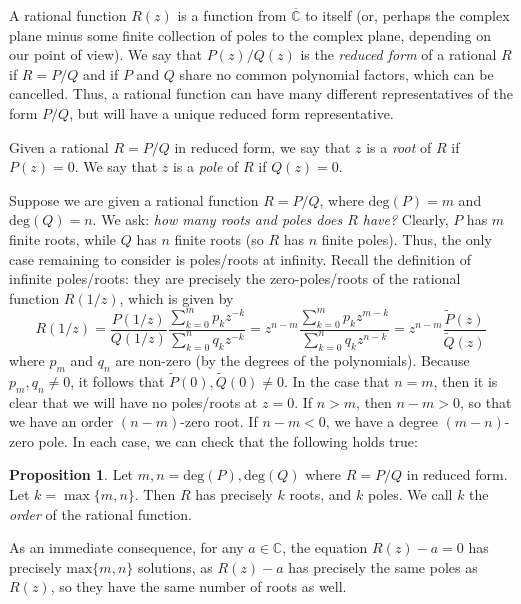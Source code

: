 \documentclass[aps,pra,showpacs,notitlepage,onecolumn,superscriptaddress,nofootinbib]{revtex4-1}
\theoremstyle{definition}
\newtheorem{proposition}{Proposition}[section]
\begin{document}
\noindent A rational function $R(z)$ is a function from $\overline{\mathbb{C}}$ to itself (or, perhaps the complex plane minus some finite collection of poles to the complex plane,
depending on our point of view). We say that $P(z)/Q(z)$ is the \emph{reduced form} of a rational $R$ if $R = P/Q$ and if $P$ and $Q$ share no common polynomial factors, which can be cancelled.
Thus, a rational function can have many different representatives of the form $P/Q$, but will have a unique reduced form representative.
\newline

\noindent Given a rational $R = P/Q$ in reduced form, we say that $z$ is a \emph{root} of $R$ if $P(z) = 0$. We say that $z$ is a \emph{pole} of $R$ if $Q(z) = 0$.
\newline

Suppose we are given a rational function $R = P/Q$, where $\text{deg}(P) = m$ and $\text{deg}(Q) = n$. We ask: \emph{how many roots and poles does $R$ have?} Clearly, $P$ has $m$ finite roots, while $Q$
has $n$ finite roots (so $R$ has $n$ finite poles). Thus, the only case remaining to consider is poles/roots at infinity. Recall the definition of infinite poles/roots: they are precisely the zero-poles/roots
of the rational function $R(1/z)$, which is given by
\begin{equation}
  R(1/z) = \frac{P(1/z)}{Q(1/z)} \frac{\sum_{k = 0}^{m} p_k z^{-k}}{\sum_{k = 0}^{n} q_k z^{-k}} = z^{n - m} \frac{\sum_{k = 0}^{m} p_k z^{m - k}}{\sum_{k = 0}^{n} q_k z^{n - k}} = z^{n - m} \frac{\widetilde{P}(z)}{\widetilde{Q}(z)}
\end{equation}
where $p_m$ and $q_n$ are non-zero (by the degrees of the polynomials). Because $p_m, q_n \neq 0$, it follows that $\widetilde{P}(0), \widetilde{Q}(0) \neq 0$. In the case that $n = m$, then it is clear that
we will have no poles/roots at $z = 0$. If $n > m$, then $n - m > 0$, so that we have an order $(n - m)$-zero root. If $n - m < 0$, we have a degree $(m - n)$-zero pole. In each case, we can check that
the following holds true:

\begin{proposition}
  Let $m, n = \text{deg}(P), \text{deg}(Q)$ where $R = P/Q$ in reduced form. Let $k = \max \{m, n\}$. Then $R$ has precisely $k$ roots, and $k$ poles.
  We call $k$ the \emph{order} of the rational function.

  As an immediate consequence, for any $a \in \mathbb{C}$, the equation $R(z) - a = 0$
  has precisely $\text{max} \{m, n\}$ solutions, as $R(z) - a$ has precisely the same poles
  as $R(z)$, so they have the same number of roots as well.
\end{proposition}
\end{document}
